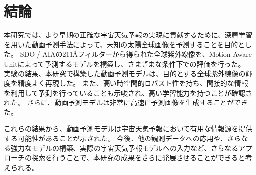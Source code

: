 \chapter{結論}
  本研究では、より早期の正確な宇宙天気予報の実現に貢献するために、深層学習を用いた動画予測手法によって、未知の太陽全球画像を予測することを目的とした。
  SDO / AIAの211Åフィルターから得られた全球紫外線像を、Motion-Aware Unitによって予測するモデルを構築し、さまざまな条件下での評価を行った。
  実験の結果、本研究で構築した動画予測モデルは、目的とする全球紫外線像の輝度を精度よく再現した。
  また、高い時空間的ロバスト性を持ち、間接的な情報を利用して予測を行っていることも示唆され、高い学習能力を持つことが確認された。
  さらに、動画予測モデルは非常に高速に予測画像を生成することができた。

  これらの結果から、動画予測モデルは宇宙天気予報において有用な情報源を提供する可能性があることが示された。
  今後、他の観測データへの応用や、さらなる強力なモデルの構築、実際の宇宙天気予報モデルへの入力など、さらなるアプローチの探索を行うことで、本研究の成果をさらに発展させることができると考えられる。